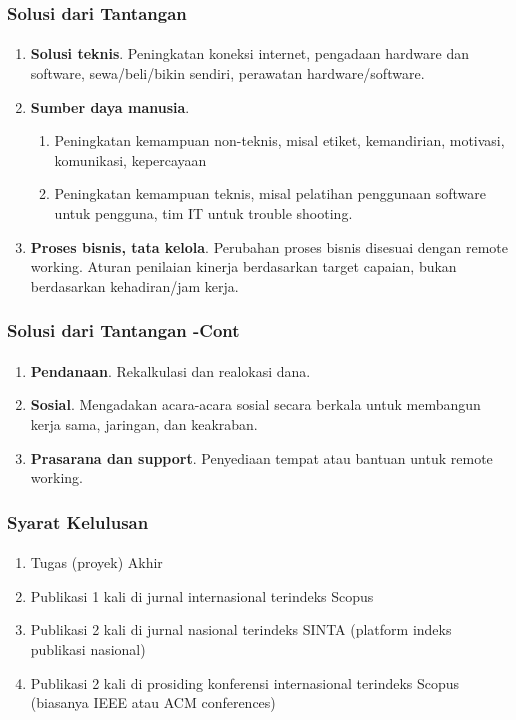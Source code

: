 \documentclass[aspectratio=169, table]{beamer}
\begin{document}
	\begin{frame}
		\frametitle{Solusi dari Tantangan}
		\framesubtitle{\hspace{1cm}}
		\begin{enumerate}
			\item \textbf{Solusi teknis}. Peningkatan koneksi internet, pengadaan hardware dan software, sewa/beli/bikin sendiri, perawatan hardware/software.
			\item \textbf{Sumber daya manusia}.
			\begin{enumerate}
				\item Peningkatan kemampuan non-teknis, misal etiket, kemandirian, motivasi, komunikasi, kepercayaan
				\item Peningkatan kemampuan teknis, misal pelatihan penggunaan software untuk pengguna, tim IT untuk trouble shooting.
			\end{enumerate}
			\item \textbf{Proses bisnis, tata kelola}. Perubahan proses bisnis disesuai dengan remote working. Aturan penilaian kinerja berdasarkan target capaian, bukan berdasarkan kehadiran/jam kerja.
		\end{enumerate}
	\end{frame}
	
	\begin{frame}
		\frametitle{Solusi dari Tantangan -Cont}
		\framesubtitle{\hspace{1cm}}
		\begin{enumerate}
			\item \textbf{Pendanaan}. Rekalkulasi dan realokasi dana. 
			\item \textbf{Sosial}. Mengadakan acara-acara sosial secara berkala untuk membangun kerja sama, jaringan, dan keakraban.
			\item \textbf{Prasarana dan support}. Penyediaan tempat atau bantuan untuk remote working.
		\end{enumerate}
	\end{frame}
	
	\begin{frame}
		\frametitle{Syarat Kelulusan}
		\framesubtitle{\hspace{1cm}}
		\begin{enumerate}
			\item Tugas (proyek) Akhir 			
			\item Publikasi 1 kali di jurnal internasional terindeks Scopus
			\item Publikasi 2 kali di jurnal nasional terindeks SINTA (platform indeks publikasi nasional)
			\item Publikasi 2 kali di prosiding konferensi internasional terindeks Scopus (biasanya IEEE atau ACM conferences)
		\end{enumerate}
	\end{frame}
	
\end{document}
